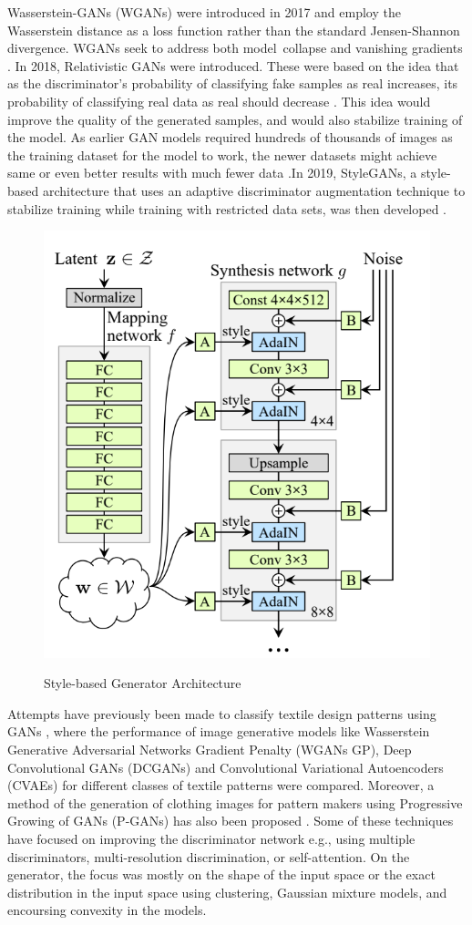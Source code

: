 \documentclass[conference]{IEEEtran}
\begin{document}
Wasserstein-GANs (WGANs) were introduced in 2017 and employ the Wasserstein distance as a loss function rather than the standard Jensen-Shannon divergence. WGANs seek to address both model collapse and vanishing gradients \cite{b14}. In 2018, Relativistic GANs were introduced. These were based on the idea that as the discriminator's probability of classifying fake samples as real increases, its probability of classifying real data as real should decrease \cite{b15}. This idea would improve the quality of the generated samples, and would also stabilize training of the model.
As earlier GAN models required hundreds of thousands of images as the training dataset for the model to work, the newer datasets might achieve same or even better results with much fewer data .In 2019, StyleGANs, a style-based architecture that uses an adaptive discriminator augmentation technique to stabilize training while training with restricted data sets, was then developed \cite{b16}.

\begin{figure}[h]
    \centering
    \includegraphics[width=0.5\linewidth]{StyleGAN.PNG}\\
 
    \caption{Style-based Generator Architecture}
    \label{fig:my_label}
\end{figure}

Attempts have previously been made to classify textile design patterns using GANs \cite{b2}, where the performance of image generative models like Wasserstein Generative Adversarial Networks Gradient Penalty (WGANs GP), Deep Convolutional GANs (DCGANs) and Convolutional Variational Autoencoders (CVAEs) for different classes of textile patterns were compared. Moreover, a method of the generation of clothing images for pattern makers using Progressive Growing of GANs (P-GANs) has also been proposed \cite{b4}. Some of these techniques have focused on improving the discriminator network e.g., using multiple discriminators, multi-resolution discrimination, or self-attention. On the generator, the focus was mostly on the shape of the input space or the exact distribution in the input space using clustering, Gaussian mixture models, and encoursing convexity in the models.
\end{document}
